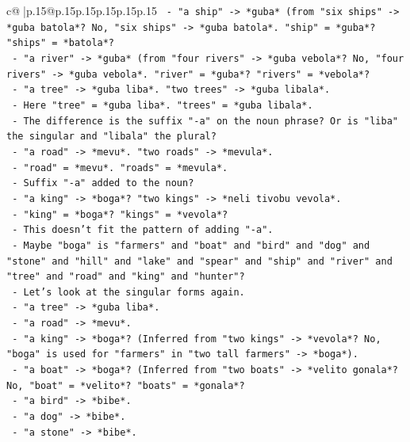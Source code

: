 \documentclass{article}
\begin{document}
{\begin{supertabular}{c@{$\;$}|p{.15\linewidth}@{}p{.15\linewidth}p{.15\linewidth}p{.15\linewidth}p{.15\linewidth}p{.15\linewidth}}
{{{\texttt{      {-} "a ship" {-}> *guba* (from "six ships" {-}> *guba batola*? No, "six ships" {-}> *guba batola*. "ship" = *guba*? "ships" = *batola*?} \\
\texttt{      {-} "a river" {-}> *guba* (from "four rivers" {-}> *guba vebola*? No, "four rivers" {-}> *guba vebola*. "river" = *guba*? "rivers" = *vebola*?} \\
\texttt{      {-} "a tree" {-}> *guba liba*. "two trees" {-}> *guba libala*.} \\
\texttt{        {-} Here "tree" = *guba liba*. "trees" = *guba libala*.} \\
\texttt{        {-} The difference is the suffix "{-}a" on the noun phrase? Or is "liba" the singular and "libala" the plural?} \\
\texttt{        {-} "a road" {-}> *mevu*. "two roads" {-}> *mevula*.} \\
\texttt{          {-} "road" = *mevu*. "roads" = *mevula*.} \\
\texttt{          {-} Suffix "{-}a" added to the noun?} \\
\texttt{        {-} "a king" {-}> *boga*? "two kings" {-}> *neli tivobu vevola*.} \\
\texttt{          {-} "king" = *boga*? "kings" = *vevola*?} \\
\texttt{          {-} This doesn't fit the pattern of adding "{-}a".} \\
\texttt{          {-} Maybe "boga" is "farmers" and "boat" and "bird" and "dog" and "stone" and "hill" and "lake" and "spear" and "ship" and "river" and "tree" and "road" and "king" and "hunter"?} \\
\texttt{          {-} Let's look at the singular forms again.} \\
\texttt{          {-} "a tree" {-}> *guba liba*.} \\
\texttt{          {-} "a road" {-}> *mevu*.} \\
\texttt{          {-} "a king" {-}> *boga*? (Inferred from "two kings" {-}> *vevola*? No, "boga" is used for "farmers" in "two tall farmers" {-}> *boga*).} \\
\texttt{          {-} "a boat" {-}> *boga*? (Inferred from "two boats" {-}> *velito gonala*? No, "boat" = *velito*? "boats" = *gonala*?} \\
\texttt{          {-} "a bird" {-}> *bibe*.} \\
\texttt{          {-} "a dog" {-}> *bibe*.} \\
\texttt{          {-} "a stone" {-}> *bibe*.} \\
}}}
\end{supertabular}}
\end{document}
